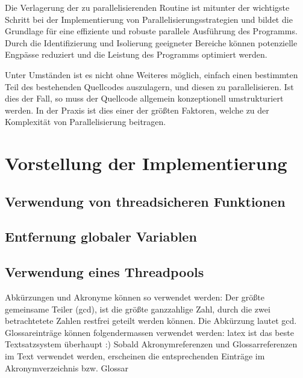 Die Verlagerung der zu parallelisierenden Routine ist mitunter der wichtigste Schritt bei der Implementierung von Parallelisierungsstrategien und bildet die Grundlage für eine effiziente und robuste parallele Ausführung des Programms. Durch die Identifizierung und Isolierung geeigneter Bereiche können potenzielle Engpässe reduziert und die Leistung des Programms optimiert werden.

Unter Umständen ist es nicht ohne Weiteres möglich, einfach einen bestimmten Teil des bestehenden Quellcodes auszulagern, und diesen zu parallelisieren. Ist dies der Fall, so muss der Quellcode allgemein konzeptionell umstrukturiert werden. In der Praxis ist dies einer der größten Faktoren, welche zu der Komplexität von Parallelisierung beitragen.

\section{Vorstellung der Implementierung}
\label{sec:Vorstellung_Implementierung}

\subsection{Verwendung von threadsicheren Funktionen}
\label{sec:Verwendung_threadsichere_Funktionen}

\subsection{Entfernung globaler Variablen}
\label{sec:Entfernung_globaler_Variablen}

\subsection{Verwendung eines Threadpools}
\label{sec:Verwendung_Thread_Pool}

Abkürzungen und Akronyme können so verwendet werden: Der größte gemeinsame Teiler (\acrlong{gcd}), ist die größte ganzzahlige Zahl, durch die
zwei betrachtetete Zahlen restfrei geteilt werden können.
Die Abkürzung lautet \acrshort{gcd}.\\
Glossareinträge können folgendermassen verwendet werden:  \Gls{latex} ist das beste Textsatzsystem überhaupt :) 
Sobald Akronymreferenzen und Glossarreferenzen im Text verwendet werden, erscheinen die entsprechenden Einträge im Akronymverzeichnis bzw. Glossar